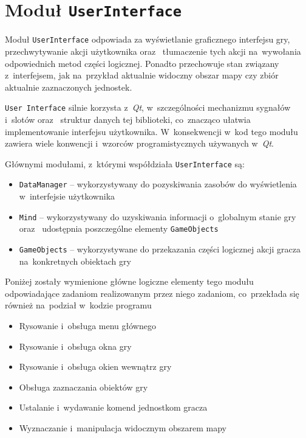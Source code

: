 \documentclass[licencjacka]{pracamgr}
\begin{document}
  \section{Moduł \texttt{UserInterface}}
    Moduł \texttt{UserInterface} odpowiada za wyświetlanie graficznego interfejsu gry, przechwytywanie akcji użytkownika
    oraz~ tłumaczenie tych akcji na~wywołania odpowiednich metod części logicznej. Ponadto przechowuje stan związany
    z~interfejsem, jak na~przykład aktualnie widoczny obszar mapy czy zbiór aktualnie zaznaczonych jednostek.

    \texttt{User Interface} silnie korzysta z~\emph{Qt}, w~szczególności mechanizmu sygnałów i~slotów oraz~ struktur danych
    tej biblioteki, co~znacząco ułatwia implementowanie interfejsu użytkownika. W~konsekwencji w~kod tego modułu zawiera wiele
    konwencji i~wzorców programistycznych używanych w~\emph{Qt}.

    Głównymi modułami, z~którymi współdziała \texttt{UserInterface} są:
    \begin{itemize}
     \item \texttt{DataManager} -- wykorzystywany do pozyskiwania zasobów do wyświetlenia w~interfejsie użytkownika
     \item \texttt{Mind} -- wykorzystywany do uzyskiwania informacji o~globalnym stanie gry oraz~ udostępnia poszczególne elementy \texttt{GameObjects}
     \item \texttt{GameObjects} -- wykorzystywane do przekazania części logicznej akcji gracza na~konkretnych obiektach gry
    \end{itemize}

    Poniżej zostały wymienione główne logiczne elementy tego modułu odpowiadające zadaniom realizowanym przez niego zadaniom,
    co~przekłada się również na~podział w~kodzie programu

    \begin{itemize}
     \item Rysowanie i~obsługa menu głównego
     \item Rysowanie i~obsługa okna gry
     \item Rysowanie i~obsługa okien wewnątrz gry
     \item Obsługa zaznaczania obiektów gry
     \item Ustalanie i~wydawanie komend jednostkom gracza
     \item Wyznaczanie i~manipulacja widocznym obszarem mapy
    \end{itemize}
\end{document}
